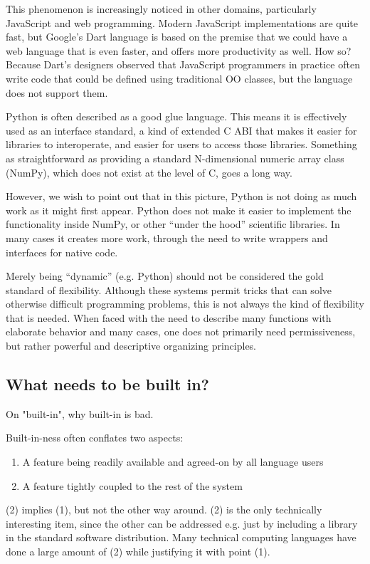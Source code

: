 {This phenomenon is increasingly noticed in other domains, particularly
JavaScript and web programming. Modern JavaScript implementations are
quite fast, but Google's Dart language is based on the premise that
we could have a web language that is even faster, and offers more
productivity as well. How so? Because Dart's designers observed that
JavaScript programmers in practice often write code that could be
defined using traditional OO classes, but the language does not
support them.

Python is often described as a good glue language. This
means it is effectively used as an interface standard, a kind of
extended C ABI that makes it easier for libraries to interoperate,
and easier for users to access those libraries. Something as straightforward
as providing a standard N-dimensional numeric array class (NumPy),
which does not exist at the level of C, goes a long way.

However, we wish to point out that in this picture, Python is not
doing as much work as it might first appear. Python does not make
it easier to implement the functionality inside NumPy, or other
``under the hood'' scientific libraries. In many cases it creates
more work, through the need to write wrappers and interfaces
for native code.

Merely being ``dynamic'' (e.g. Python) should not be considered
the gold standard of flexibility. Although these systems permit
tricks that can solve otherwise difficult programming problems,
this is not always the kind of flexibility that is needed.
When faced with the need to describe many functions with elaborate
behavior and many cases, one does not primarily need permissiveness,
but rather powerful and descriptive organizing principles.


\subsection{What needs to be built in?}

On "built-in", why built-in is bad.

Built-in-ness often conflates two aspects:

\begin{enumerate}
\item A feature being readily available and agreed-on by all language users
\item A feature tightly coupled to the rest of the system
\end{enumerate}

(2) implies (1), but not the other way around. (2) is the only technically
interesting item, since the other can be addressed e.g. just by including
a library in the standard software distribution. Many technical computing
languages have done a large amount of (2) while justifying it with point (1).


}
